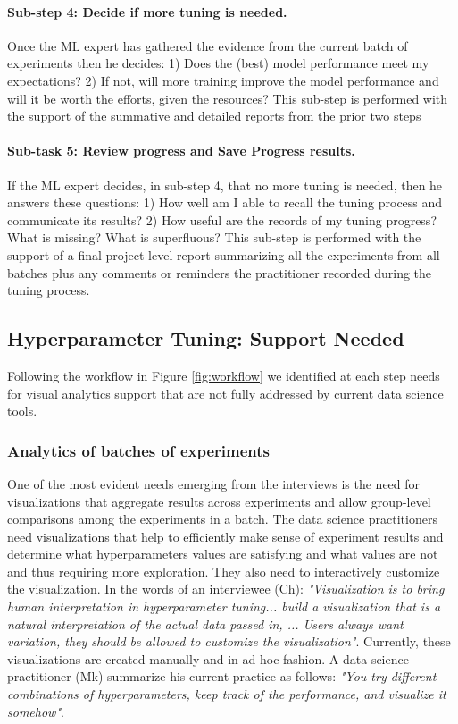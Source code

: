 \documentclass[preprint]{vgtc}        %
\begin{document}
\paragraph{Sub-step 4: Decide if more tuning is needed.} Once the ML expert has gathered the evidence from the current batch of experiments then he decides: 1) Does the (best) model performance meet my expectations? 2) If not, will more training improve the model performance and will it be worth the efforts, given the resources?
This sub-step is performed with the support of the summative and detailed reports from the prior two steps

\paragraph{Sub-task 5: Review progress and Save Progress results.} If the ML expert decides, in sub-step 4, that no more tuning is needed, then he answers these questions: 1) How well am I able to recall the tuning process and communicate its results? 2) How useful are the records of my tuning progress? What is missing? What is superfluous? 
This sub-step is performed with the support of a final project-level report summarizing all the experiments from all batches plus any comments or reminders the practitioner recorded during the tuning process.

\subsection{Hyperparameter Tuning: Support Needed}
Following the workflow in Figure \ref{fig:workflow} we identified at each step needs for visual analytics support that are not fully addressed by current data science tools.

\subsubsection{Analytics of batches of experiments}
One of the most evident needs emerging from the interviews is the need for visualizations that aggregate results across experiments and allow group-level comparisons among the experiments in a batch. 
The data science practitioners need visualizations that help to efficiently make sense of experiment results and determine what hyperparameters values are satisfying and what values are not and thus requiring more exploration. They also need to interactively customize the visualization. In the words of an interviewee (Ch): \textit{"Visualization is to bring human interpretation in hyperparameter tuning... build a visualization that is a natural interpretation of the actual data passed in, ... Users always want variation, they should be allowed to customize the visualization"}. Currently, these visualizations are created manually and in ad hoc fashion. A data science practitioner (Mk) summarize his current practice as follows: \textit{"You try different combinations of hyperparameters, keep track of the performance, and visualize it somehow"}.   
\end{document}
